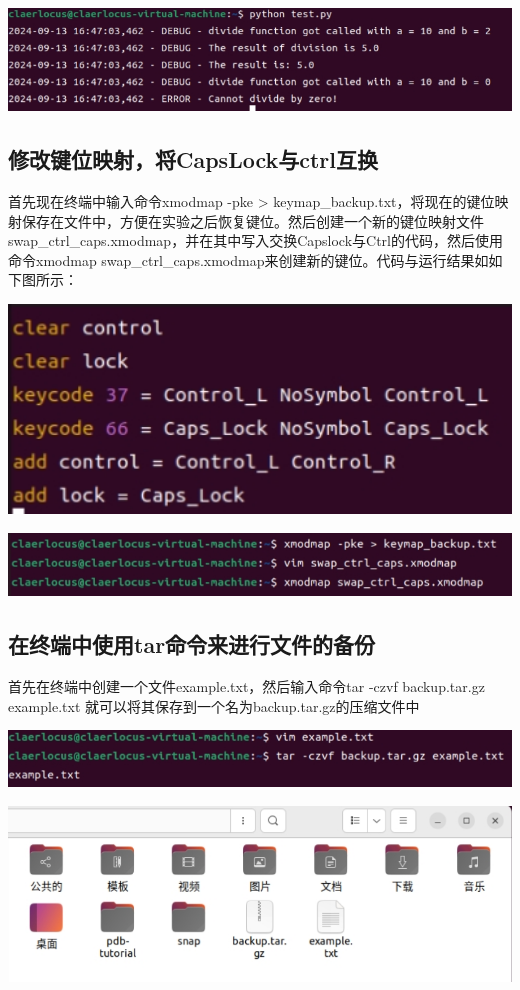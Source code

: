 \documentclass[UTF8,a4paper]{ctexart}
\begin{document}
\begin{sloppypar}
	\includegraphics[width = 14cm]{18}
	
	\subsection{修改键位映射，将CapsLock与ctrl互换}
	首先现在终端中输入命令xmodmap -pke > keymap\_backup.txt，将现在的键位映射保存在文件中，方便在实验之后恢复键位。然后创建一个新的键位映射文件swap\_ctrl\_caps.xmodmap，并在其中写入交换Capslock与Ctrl的代码，然后使用命令xmodmap swap\_ctrl\_caps.xmodmap来创建新的键位。代码与运行结果如如下图所示：
	
	\includegraphics[width = 14cm]{19}
	
	\includegraphics[width = 14cm]{20}
	
	\subsection{在终端中使用tar命令来进行文件的备份}
	首先在终端中创建一个文件example.txt，然后输入命令tar -czvf backup.tar.gz example.txt
	就可以将其保存到一个名为backup.tar.gz的压缩文件中
	
	\includegraphics[width = 14cm]{21}
	
	\includegraphics[width = 14cm]{22}
	

\end{sloppypar}
\end{document}
